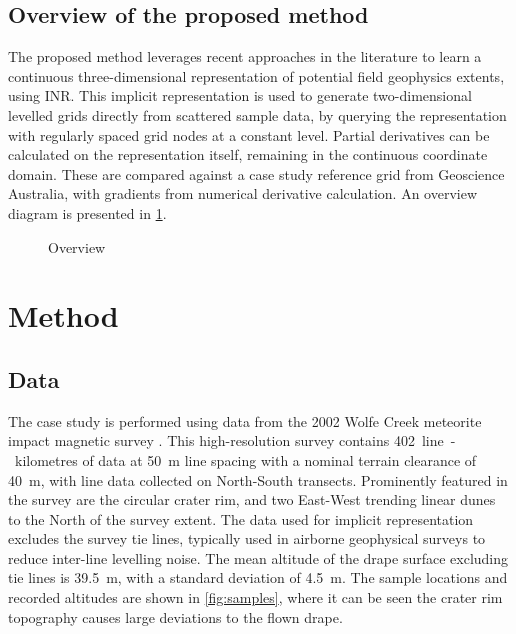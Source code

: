 \documentclass[manuscript.tex]{subfiles}
\begin{document}
\subsection{Overview of the proposed method}
\label{sec:overview}
The proposed method leverages recent approaches in the literature to learn a continuous three-dimensional representation of potential field geophysics extents, using INR\@.
This implicit representation is used to generate two-dimensional levelled grids directly from scattered sample data, by querying the representation with regularly spaced grid nodes at a constant level.
Partial derivatives can be calculated on the representation itself, remaining in the continuous coordinate domain.
These are compared against a case study reference grid from Geoscience Australia, with gradients from numerical derivative calculation.
An overview diagram is presented in \cref{fig:overview}.

\begin{figure}[hbt]
    \centering{}
    \caption[Overview of the proposed method]{Overview}
    
    \label{fig:overview}
\end{figure}

\section{Method}

\subsection{Data}
The case study is performed using data from the 2002 Wolfe Creek meteorite impact magnetic survey \parencite{wolfecreek2019}.
This high-resolution survey contains \SI{402}{line-kilometres} of data at \SI{50}{\m} line spacing with a nominal terrain clearance of \SI{40}{\m}, with line data collected on North-South transects.
Prominently featured in the survey are the circular crater rim, and two East-West trending linear dunes to the North of the survey extent.
The data used for implicit representation excludes the survey tie lines, typically used in airborne geophysical surveys to reduce inter-line levelling noise.
The mean altitude of the drape surface excluding tie lines is \SI{39.5}{\m}, with a standard deviation of \SI{4.5}{\m}.
The sample locations and recorded altitudes are shown in \cref{fig:samples}, where it can be seen the crater rim topography causes large deviations to the flown drape.
\end{document}
